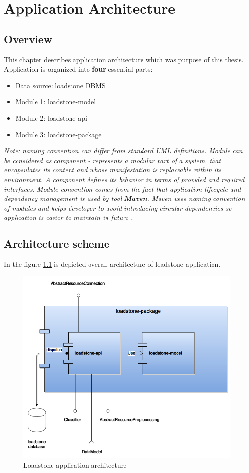 \chapter{Application Architecture}
\section{Overview}
This chapter describes application architecture which was purpose of this thesis. Application is organized into \textbf{four} essential parts:
\begin{itemize}
	\item Data source: loadstone DBMS
	\item Module 1: loadstone-model
	\item Module 2: loadstone-api
	\item Module 3: loadstone-package
\end{itemize}

\textit{Note: naming convention can differ from standard UML definitions. Module can be considered as component - represents a modular part of a system, that encapsulates its content and whose manifestation is replaceable within its environment. A component defines its behavior in terms of provided and required interfaces\cite{22}. Module convention comes from the fact that application lifecycle and dependency management is used by tool \textbf{Maven}. Maven uses naming convention of modules and helps developer to avoid introducing circular dependencies so application is easier to maintain in future \cite{23}.}

\section{Architecture scheme}
In the figure \ref{fig:@=architecture} is depicted overall architecture of loadstone application.
\begin{figure}
	\centering
	\includegraphics[scale=0.6]{architecture.png}
	\caption{Loadstone application architecture}
	\label{fig:@=architecture}
\end{figure}

